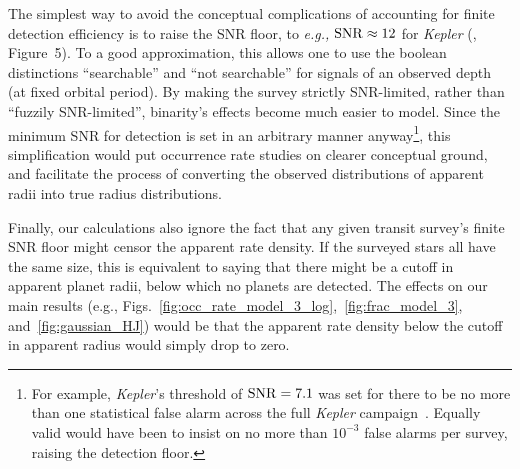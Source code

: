 \documentclass[12pt,modern]{aastex61}
\begin{document}
The simplest way to avoid the conceptual complications of accounting
for finite detection efficiency is to raise the SNR floor, to {\it
e.g.,} ${\rm SNR} \approx 12$ for {\it Kepler}
(\citealt{fulton_california-_2017}, Figure~5).  To a good
approximation, this allows one to use the boolean distinctions
``searchable'' and ``not searchable'' for signals of an observed depth
(at fixed orbital period).  By making the survey strictly SNR-limited,
rather than ``fuzzily SNR-limited'', binarity's effects become much
easier to model.  Since the minimum SNR for detection is set in an
arbitrary manner anyway\footnote{For example, {\it Kepler}'s threshold
of ${\rm SNR}=7.1$ was set for there to be no more than one
statistical false alarm across the full {\it Kepler}
campaign~\citep{jenkins_tests_2002}. Equally valid would have been to
insist on no more than $10^{-3}$ false alarms per survey, raising the
detection floor.  }, this simplification would put occurrence rate
studies on clearer conceptual ground, and facilitate the process of
converting the observed distributions of apparent radii into true
radius distributions.

Finally, our calculations also ignore the fact that any given transit
survey's finite SNR floor might censor the apparent rate density.  If
the surveyed stars all have the same size, this is equivalent to
saying that there might be a cutoff in apparent planet radii, below
which no planets are detected.  The effects on our main results (e.g.,
Figs.~\ref{fig:occ_rate_model_3_log},~\ref{fig:frac_model_3},
and~\ref{fig:gaussian_HJ}) would be that the apparent rate density
below the cutoff in apparent radius would simply drop to zero.

\end{document}
